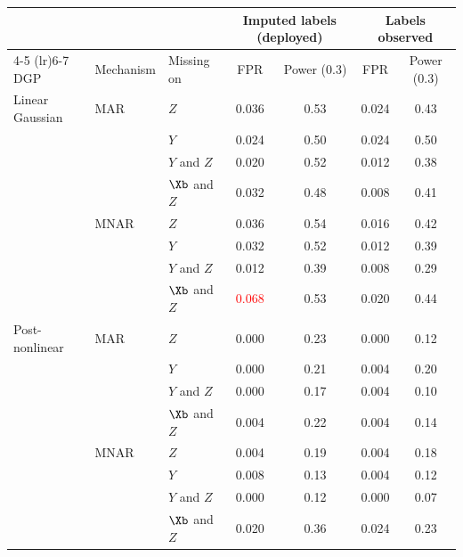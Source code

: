 \begin{tabular}{lllcccc}
    \toprule
     & & & \multicolumn{2}{c}{Imputed labels (deployed)} & \multicolumn{2}{c}{Labels observed} \\
    \cmidrule(lr){4-5} \cmidrule(lr){6-7}
    DGP & Mechanism & Missing on & FPR & Power (0.3) & FPR & Power (0.3) \\
    \midrule
    Linear Gaussian  & MAR   & $Z$            & 0.036 & 0.53 & 0.024 & 0.43 \\
                     &       & $Y$            & 0.024 & 0.50 & 0.024 & 0.50 \\
                     &       & $Y$ and $Z$    & 0.020 & 0.52 & 0.012 & 0.38 \\
                     &       & $\Xb$ and $Z$  & 0.032 & 0.48 & 0.008 & 0.41 \\
                     & MNAR  & $Z$            & 0.036 & 0.54 & 0.016 & 0.42 \\
                     &       & $Y$            & 0.032 & 0.52 & 0.012 & 0.39 \\
                     &       & $Y$ and $Z$    & 0.012 & 0.39 & 0.008 & 0.29 \\
                     &       & $\Xb$ and $Z$  & \textcolor{red}{0.068} & 0.53 & 0.020 & 0.44 \\
    \midrule
    Post-nonlinear   & MAR   & $Z$            & 0.000 & 0.23 & 0.000 & 0.12 \\
                     &       & $Y$            & 0.000 & 0.21 & 0.004 & 0.20 \\
                     &       & $Y$ and $Z$    & 0.000 & 0.17 & 0.004 & 0.10 \\
                     &       & $\Xb$ and $Z$  & 0.004 & 0.22 & 0.004 & 0.14 \\
                     & MNAR  & $Z$            & 0.004 & 0.19 & 0.004 & 0.18 \\
                     &       & $Y$            & 0.008 & 0.13 & 0.004 & 0.12 \\
                     &       & $Y$ and $Z$    & 0.000 & 0.12 & 0.000 & 0.07 \\
                     &       & $\Xb$ and $Z$  & 0.020 & 0.36 & 0.024 & 0.23 \\
    \bottomrule
\end{tabular}
